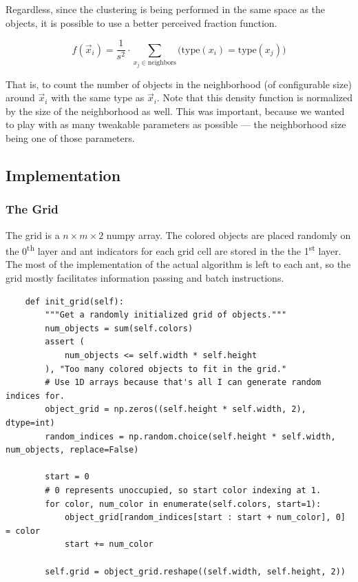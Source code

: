 \documentclass[12pt]{article}
\begin{document}
Regardless, since the clustering is being performed in the same space as the objects, it is possible to use a better perceived fraction function.

\begin{equation}
    f(\vec x_i) = \frac{1}{s^2}\cdot\sum_{x_j \in \text{neighbors}}\bigg(\mathrm{type}(x_i) = \mathrm{type}(x_j)\bigg)\label{eq:aca:density}
\end{equation}

That is, to count the number of objects in the neighborhood (of configurable size) around $\vec x_i$ with the same type as $\vec x_i$.
Note that this density function is normalized by the size of the neighborhood as well.
This was important, because we wanted to play with as many tweakable parameters as possible --- the neighborhood size being one of those parameters.

\subsection{Implementation}

\subsubsection{The Grid}
The grid is a \(n \times m \times 2\) numpy array.
The colored objects are placed randomly on the 0\textsuperscript{th} layer and ant indicators for each grid cell are stored in the the 1\textsuperscript{st} layer.
The most of the implementation of the actual algorithm is left to each ant, so the grid mostly facilitates information passing and batch instructions.

\begin{verbatim}
    def init_grid(self):
        """Get a randomly initialized grid of objects."""
        num_objects = sum(self.colors)
        assert (
            num_objects <= self.width * self.height
        ), "Too many colored objects to fit in the grid."
        # Use 1D arrays because that's all I can generate random indices for.
        object_grid = np.zeros((self.height * self.width, 2), dtype=int)
        random_indices = np.random.choice(self.height * self.width, num_objects, replace=False)

        start = 0
        # 0 represents unoccupied, so start color indexing at 1.
        for color, num_color in enumerate(self.colors, start=1):
            object_grid[random_indices[start : start + num_color], 0] = color
            start += num_color

        self.grid = object_grid.reshape((self.width, self.height, 2))
\end{verbatim}
\end{document}
